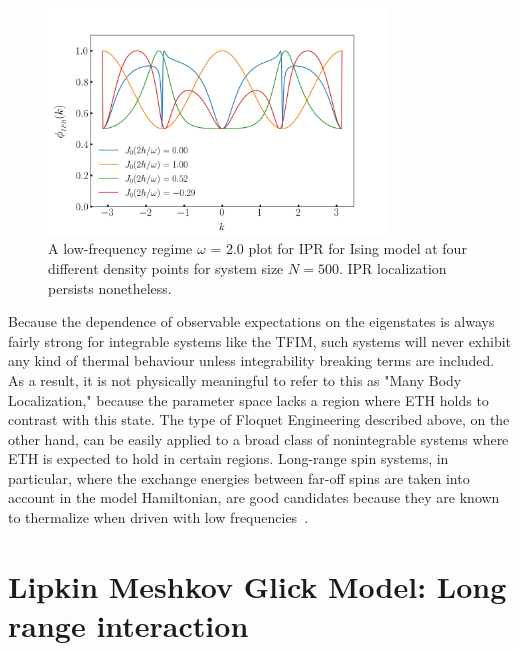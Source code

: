 \documentclass[%
reprint,
superscriptaddress,
amsmath,amssymb,
aps,
prb,
]{revtex4-2}
\begin{document}
	
	\begin{figure}[]
		\centering
		\includegraphics[height = 6cm, width =9cm]{low_frq_exactN500_ipr.jpeg}
		\caption{A low-frequency regime $\omega$ = 2.0 plot for IPR for Ising model at four different density points for system size $N = 500$. IPR localization persists nonetheless.}
		\label{fig:ipr:isinglowfrk}
	\end{figure}
	
	Because the dependence of observable expectations on the eigenstates is always fairly strong for integrable systems like the TFIM, such systems will never exhibit any kind of thermal behaviour unless integrability breaking terms are included. As a result, it is not physically meaningful to refer to this as "Many Body Localization," because the parameter space lacks a region where ETH holds to contrast with this state. The type of Floquet Engineering described above, on the other hand, can be easily applied to a broad class of nonintegrable systems where ETH is expected to hold in certain regions. Long-range spin systems, in particular, where the exchange energies between far-off spins are taken into account in the model Hamiltonian, are good candidates because they are known to thermalize when driven with low frequencies~\cite{russomanno_thermalization_2015}.
	\section{\label{sec:level3}Lipkin Meshkov Glick Model: Long range interaction}	
	
\end{document}
